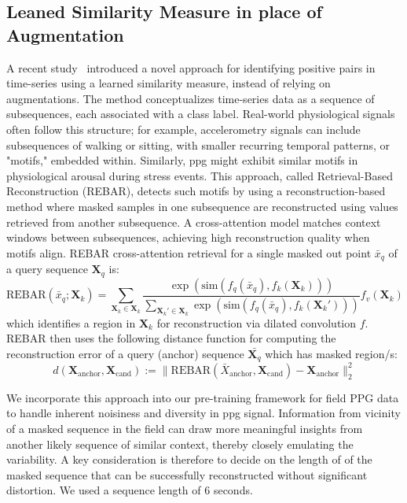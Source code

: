 \subsection{Leaned Similarity Measure in place of Augmentation}
A recent study~\cite{xurebar} introduced a novel approach for identifying positive pairs in time-series using a learned similarity measure, instead of relying on augmentations. The method conceptualizes time-series data as a sequence of subsequences, each associated with a class label. Real-world physiological signals often follow this structure; for example, accelerometry signals can include subsequences of walking or sitting, with smaller recurring temporal patterns, or "motifs," embedded within. Similarly, ppg might exhibit similar motifs in physiological arousal during stress events. This approach, called Retrieval-Based Reconstruction (REBAR), detects such motifs by using a reconstruction-based method where masked samples in one subsequence are reconstructed using values retrieved from another subsequence. A cross-attention model matches context windows between subsequences, achieving high reconstruction quality when motifs align.
REBAR cross-attention retrieval for a single masked out point $\bar{x}_q$ of a query sequence $\textbf{X}_q$ is: 
$$
\text{REBAR}(\bar{x}_q; \textbf{X}_k) = \sum_{\textbf{X}_k \in \textbf{X}_k} \frac{\exp\left(\text{sim}\left(f_q(\bar{x}_q), f_k(\textbf{X}_k)\right)\right)}{\sum_{\textbf{X}_k' \in \textbf{X}_k} \exp\left(\text{sim}\left(f_q(\bar{x}_q), f_k(\textbf{X}_k')\right)\right)} f_v(\textbf{X}_k)
$$
which identifies a region in $\textbf{X}_k$ for reconstruction via dilated convolution $f$. REBAR then uses the following distance function for computing the reconstruction error of a query (anchor) sequence $\bar{\textbf{X}_q}$ which has masked region/s:
$$
d(\textbf{X}_{\text{anchor}}, \textbf{X}_{\text{cand}}) := \lVert \text{REBAR}(\bar{X}_{\text{anchor}}, \textbf{X}_{\text{cand}}) - \textbf{X}_{\text{anchor}} \rVert_2^2
$$

We incorporate this approach into our pre-training framework for field PPG data to handle inherent noisiness and diversity in ppg signal. Information from vicinity of a masked sequence in the field can draw more meaningful insights from another likely sequence of similar context, thereby closely emulating the variability. A key consideration is therefore to decide on the length of of the masked sequence that can be successfully reconstructed without significant distortion. We used a sequence length of 6 seconds. 

